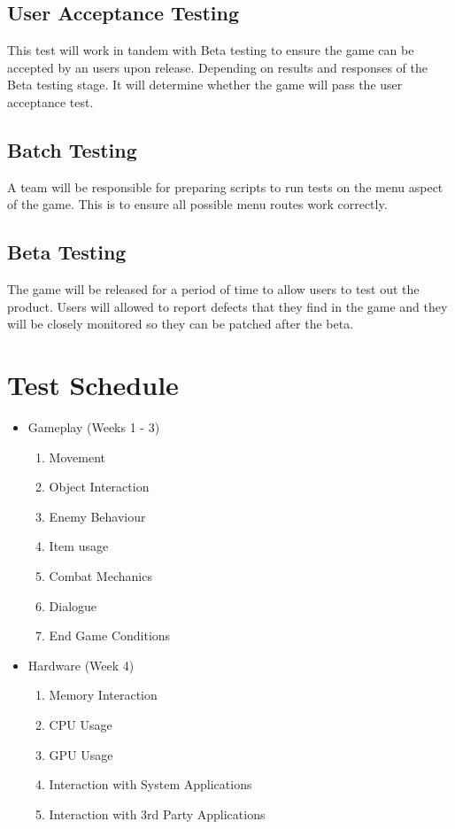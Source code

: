 \documentclass[a4paper, 10pt]{article}
\begin{document}
    \subsection{User Acceptance Testing}
    This test will work in tandem with Beta testing to ensure the game can be accepted by an users upon release. Depending on results and responses of the Beta testing stage. It will determine whether the game will pass the user acceptance test.
    \subsection{Batch Testing}
    A team will be responsible for preparing scripts to run tests on the menu aspect of the game. This is to ensure all possible menu routes work correctly. 
    \subsection{Beta Testing}
    The game will be released for a period of time to allow users to test out the product. Users will allowed to report defects that they find in the game and they will be closely monitored so they can be patched after the beta.

\section{Test Schedule}
\begin{itemize}
    \item Gameplay (Weeks 1 - 3)
    \begin{enumerate}
        \item Movement
        \item Object Interaction
        \item Enemy Behaviour
        \item Item usage
        \item Combat Mechanics
        \item Dialogue
        \item End Game Conditions
    \end{enumerate}
    \item Hardware (Week 4)
    \begin{enumerate}
        \item Memory Interaction
        \item CPU Usage
        \item GPU Usage
        \item Interaction with System Applications
        \item Interaction with 3rd Party Applications
    \end{enumerate}
\end{itemize}
\end{document}
